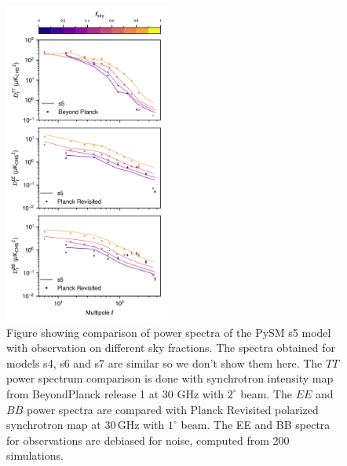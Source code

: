 \documentclass[twocolumn]{aastex631}
\begin{document}
\begin{figure}
   \centering
   \includegraphics[width=0.48\textwidth]{figures/Dlcomp_PySM3-4_s5_vs_BPPR_SYNC.png}
    \caption{Figure showing comparison of power spectra of the PySM s5 model with observation on different sky fractions. The spectra obtained for models s4, s6 and s7 are similar so we don't show them here. The $TT$ power spectrum comparison is done with synchrotron intensity map from BeyondPlanck release 1 \citep{Andersen:2023} at 30 GHz with $2^\circ$ beam. The $EE$ and $BB$ power spectra are compared with Planck Revisited \citep{Delabrouille:2024} polarized synchrotron map at 30\,GHz with $1^\circ$ beam. The EE and BB spectra for observations are debiased for noise, computed from 200 simulations.}
   \label{fig:Dl_sync_galmask}
\end{figure}
\end{document}
